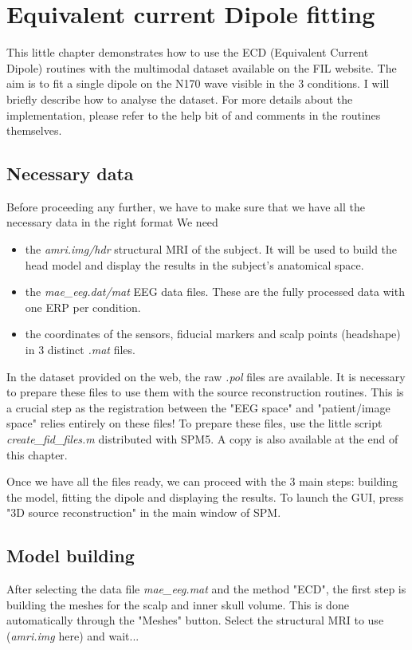 \chapter{Equivalent current Dipole fitting}
\label{ch:eeg_ecd}

This little chapter demonstrates how to use the ECD (Equivalent Current Dipole) routines with the multimodal dataset available on the FIL website. The aim is to fit a single dipole on the N170 wave visible in the 3 conditions.
I will briefly describe how to analyse the dataset. For more details about the implementation, please refer to the help bit of and comments in the routines themselves.

\section{Necessary data}
Before proceeding any further, we have to make sure that we have all the necessary data in the right format
We need 
\begin{itemize}
\item the {\it amri.img/hdr} structural MRI of the subject. It will be used to build the head model and display the results in the subject's anatomical space.\\
\item the {\it mae\_eeg.dat/mat} EEG data files. These are the fully processed data with one ERP per condition.
\item the coordinates of the sensors, fiducial markers and scalp points (headshape) in 3 distinct {\it *.mat} files.
\end{itemize}

In the dataset provided on the web, the raw {\it *.pol} files are available. It is necessary to prepare these files to use them with the source reconstruction routines. This is a crucial step as the registration between the "EEG space" and "patient/image space" relies entirely on these files! 
To prepare these files, use the little script {\it create\_fid\_files.m} distributed with SPM5. A copy is also available at the end of this chapter.

Once we have all the files ready, we can proceed with the 3 main steps: building the model, fitting the dipole and displaying the results. To launch the GUI, press "3D source reconstruction" in the main window of SPM.

\section{Model building}
After selecting the data file {\it mae\_eeg.mat} and the method "ECD", the first step is building the meshes for the scalp and inner skull volume. This is done automatically through the "Meshes" button. Select the structural MRI to use ({\it amri.img} here) and wait...

